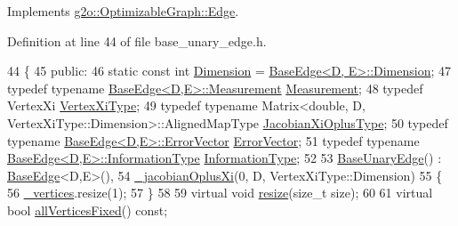 Implements \hyperlink{classg2o_1_1OptimizableGraph_1_1Edge_a56fbf3430ddf591e3c619bdd1b7e4499}{g2o\+::\+Optimizable\+Graph\+::\+Edge}.



Definition at line 44 of file base\+\_\+unary\+\_\+edge.\+h.


\begin{DoxyCode}
44   \{
45     \textcolor{keyword}{public}:
46       \textcolor{keyword}{static} \textcolor{keyword}{const} \textcolor{keywordtype}{int} \hyperlink{classg2o_1_1BaseUnaryEdge_a4e584cf552998a34948d8d5b484f7fd3}{Dimension} = \hyperlink{classg2o_1_1BaseEdge_ab4812acb21e0b9de80dc6d676e71cb70}{BaseEdge<D, E>::Dimension};
47       \textcolor{keyword}{typedef} \textcolor{keyword}{typename} \hyperlink{classg2o_1_1BaseEdge_a2c148abba650a20b8c7eed75d3e2211e}{BaseEdge<D,E>::Measurement} 
      \hyperlink{classg2o_1_1BaseUnaryEdge_ab953b076b4c35fcf99de02bd0bfcc1ae}{Measurement};
48       \textcolor{keyword}{typedef} VertexXi \hyperlink{classg2o_1_1BaseUnaryEdge_a503e62e74775172c008135650850d511}{VertexXiType};
49       \textcolor{keyword}{typedef} \textcolor{keyword}{typename} Matrix<double, D, VertexXiType::Dimension>::AlignedMapType 
      \hyperlink{classg2o_1_1BaseUnaryEdge_a24bcabd661223e15b7337f2835310f5e}{JacobianXiOplusType};
50       \textcolor{keyword}{typedef} \textcolor{keyword}{typename} \hyperlink{classg2o_1_1BaseEdge_af5b558dd24e4be2e437563cae4b3550d}{BaseEdge<D,E>::ErrorVector} 
      \hyperlink{classg2o_1_1BaseUnaryEdge_abc04cfacb65fc72825156f1b3346dd48}{ErrorVector};
51       \textcolor{keyword}{typedef} \textcolor{keyword}{typename} \hyperlink{classg2o_1_1BaseEdge_a2e5a33343ac3f189d8a7d5ee4d8b73fc}{BaseEdge<D,E>::InformationType} 
      \hyperlink{classg2o_1_1BaseUnaryEdge_a6753caa95c30fa5bb3887e2a30892ff3}{InformationType};
52 
53       \hyperlink{classg2o_1_1BaseUnaryEdge_a7375d1ebfb57ba0308f863739b817b15}{BaseUnaryEdge}() : \hyperlink{classg2o_1_1BaseEdge_a5efd0eb7e76a7f1ad723e7a5896a54d5}{BaseEdge}<D,E>(),
54         \hyperlink{classg2o_1_1BaseUnaryEdge_af7d022a6c6c9c29dfd9147fce0dc13d8}{\_jacobianOplusXi}(0, D, VertexXiType::Dimension)
55       \{
56         \hyperlink{classg2o_1_1HyperGraph_1_1Edge_aabb036d331fc7f2524ec8611b638de92}{\_vertices}.resize(1);
57       \}
58 
59       \textcolor{keyword}{virtual} \textcolor{keywordtype}{void} \hyperlink{classg2o_1_1BaseUnaryEdge_a01fcdfd2d3ed0325655bb99db95c0b10}{resize}(\textcolor{keywordtype}{size\_t} size);
60 
61       \textcolor{keyword}{virtual} \textcolor{keywordtype}{bool} \hyperlink{classg2o_1_1BaseUnaryEdge_ae3db6c719eac18fce051b40a8c8b86dd}{allVerticesFixed}() \textcolor{keyword}{const};

\end{DoxyCode}
